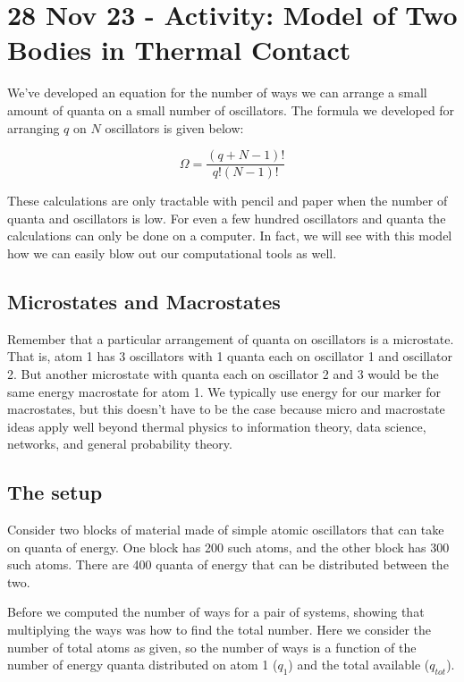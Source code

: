 \section{28 Nov 23 - Activity: Model of Two Bodies in Thermal
Contact}\label{nov-23---activity-model-of-two-bodies-in-thermal-contact}

We've developed an equation for the number of ways we can arrange a
small amount of quanta on a small number of oscillators. The formula we
developed for arranging \(q\) on \(N\) oscillators is given below:

\[\Omega = \dfrac{(q+N-1)!}{q!(N-1)!}\]

These calculations are only tractable with pencil and paper when the
number of quanta and oscillators is low. For even a few hundred
oscillators and quanta the calculations can only be done on a computer.
In fact, we will see with this model how we can easily blow out our
computational tools as well.

\subsection{Microstates and
Macrostates}\label{microstates-and-macrostates}

Remember that a particular arrangement of quanta on oscillators is a
microstate. That is, atom 1 has 3 oscillators with 1 quanta each on
oscillator 1 and oscillator 2. But another microstate with quanta each
on oscillator 2 and 3 would be the same energy macrostate for atom 1. We
typically use energy for our marker for macrostates, but this doesn't
have to be the case because micro and macrostate ideas apply well beyond
thermal physics to information theory, data science, networks, and
general probability theory.

\subsection{The setup}\label{the-setup}

Consider two blocks of material made of simple atomic oscillators that
can take on quanta of energy. One block has 200 such atoms, and the
other block has 300 such atoms. There are 400 quanta of energy that can
be distributed between the two.

Before we computed the number of ways for a pair of systems, showing
that multiplying the ways was how to find the total number. Here we
consider the number of total atoms as given, so the number of ways is a
function of the number of energy quanta distributed on atom 1 (\(q_1\))
and the total available (\(q_{tot}\)).

